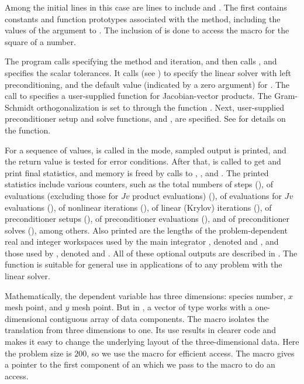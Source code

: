 Among the initial  lines in this case are lines to
include  and .  The first contains
constants and function prototypes associated with the {\spgmr} method,
including the values of the  argument to .
The inclusion of  is done to access the 
macro for the square of a  number.

The  program calls  specifying the  method
and  iteration, and then calls , and
 specifies the scalar tolerances.
It calls   (see ) to specify the {\cvspgmr} 
linear solver with left preconditioning, and the default value (indicated by a
zero argument) for .
The call to  specifies a user-supplied function
for Jacobian-vector products.
The Gram-Schmidt orthogonalization is set to 
through the function .  Next, user-supplied preconditioner
setup and solve functions,  and , are specified.
See  for details on the 
function.

For a sequence of  values,  is called in the
 mode, sampled output is printed, and the return value is
tested for error conditions.  After that,  is called
to get and print final statistics, and memory is freed by calls to
, , and .  The printed
statistics include various counters, such as the total numbers of steps
(), of  evaluations (excluding those for $Jv$ product
evaluations) (), of  evaluations for $Jv$ evaluations (),
of nonlinear iterations (), of linear (Krylov) iterations (),
of preconditioner setups (), of preconditioner evaluations
(), and of preconditioner solves (), among others.  
Also printed are the lengths of the problem-dependent real and integer
workspaces used by the main integrator , denoted  and
, and those used by {\cvspgmr}, denoted  and .
All of these optional outputs are described in .
The  function is suitable for general use in applications
of {\cvode} to any problem with the {\spgmr} linear solver.

Mathematically, the dependent variable has three dimensions: species
number, $x$ mesh point, and $y$ mesh point.  But in {\nvecs}, a vector of
type  works with a one-dimensional contiguous array of
data components. The macro  isolates the translation from
three dimensions to one. Its use results in clearer code and makes it
easy to change the underlying layout of the three-dimensional data. 
Here the problem size is $200$, so we use the  macro
for efficient  access.  The  macro gives
a pointer to the first component of an  which we pass to
the  macro to do an  access.

